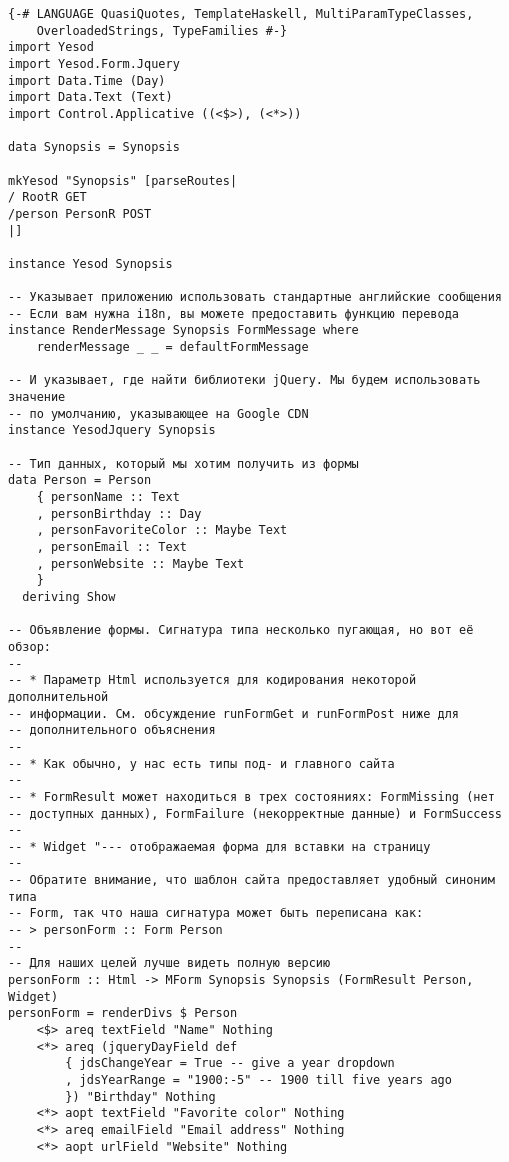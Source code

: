 \begin{lstlisting}
{-# LANGUAGE QuasiQuotes, TemplateHaskell, MultiParamTypeClasses,
    OverloadedStrings, TypeFamilies #-}
import Yesod
import Yesod.Form.Jquery
import Data.Time (Day)
import Data.Text (Text)
import Control.Applicative ((<$>), (<*>))

data Synopsis = Synopsis

mkYesod "Synopsis" [parseRoutes|
/ RootR GET
/person PersonR POST
|]

instance Yesod Synopsis

-- Указывает приложению использовать стандартные английские сообщения
-- Если вам нужна i18n, вы можете предоставить функцию перевода
instance RenderMessage Synopsis FormMessage where
    renderMessage _ _ = defaultFormMessage

-- И указывает, где найти библиотеки jQuery. Мы будем использовать значение
-- по умолчанию, указывающее на Google CDN
instance YesodJquery Synopsis

-- Тип данных, который мы хотим получить из формы
data Person = Person
    { personName :: Text
    , personBirthday :: Day
    , personFavoriteColor :: Maybe Text
    , personEmail :: Text
    , personWebsite :: Maybe Text
    }
  deriving Show

-- Объявление формы. Сигнатура типа несколько пугающая, но вот её обзор:
--
-- * Параметр Html используется для кодирования некоторой дополнительной
-- информации. См. обсуждение runFormGet и runFormPost ниже для 
-- дополнительного объяснения
--
-- * Как обычно, у нас есть типы под- и главного сайта
--
-- * FormResult может находиться в трех состояниях: FormMissing (нет
-- доступных данных), FormFailure (некорректные данные) и FormSuccess
--
-- * Widget "--- отображаемая форма для вставки на страницу
--
-- Обратите внимание, что шаблон сайта предоставляет удобный синоним типа
-- Form, так что наша сигнатура может быть переписана как:
-- > personForm :: Form Person
--
-- Для наших целей лучше видеть полную версию
personForm :: Html -> MForm Synopsis Synopsis (FormResult Person, Widget)
personForm = renderDivs $ Person
    <$> areq textField "Name" Nothing
    <*> areq (jqueryDayField def
        { jdsChangeYear = True -- give a year dropdown
        , jdsYearRange = "1900:-5" -- 1900 till five years ago
        }) "Birthday" Nothing
    <*> aopt textField "Favorite color" Nothing
    <*> areq emailField "Email address" Nothing
    <*> aopt urlField "Website" Nothing


\end{lstlisting}
